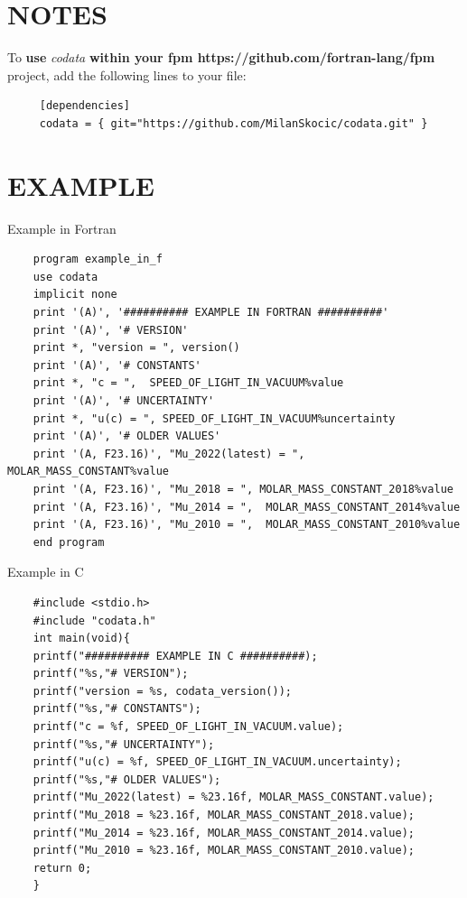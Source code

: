 \section{NOTES}

To \textbf{use }\emph{codata}\textbf{ within your fpm
https://github.com/fortran-lang/fpm} project, add the following lines to
your file:

\begin{verbatim}
     [dependencies]
     codata = { git="https://github.com/MilanSkocic/codata.git" }
\end{verbatim}

\section{EXAMPLE}

Example in Fortran

\begin{verbatim}
    program example_in_f
    use codata
    implicit none
    print '(A)', '########## EXAMPLE IN FORTRAN ##########'
    print '(A)', '# VERSION'
    print *, "version = ", version()
    print '(A)', '# CONSTANTS'
    print *, "c = ",  SPEED_OF_LIGHT_IN_VACUUM%value
    print '(A)', '# UNCERTAINTY'
    print *, "u(c) = ", SPEED_OF_LIGHT_IN_VACUUM%uncertainty
    print '(A)', '# OLDER VALUES'
    print '(A, F23.16)', "Mu_2022(latest) = ", MOLAR_MASS_CONSTANT%value
    print '(A, F23.16)', "Mu_2018 = ", MOLAR_MASS_CONSTANT_2018%value
    print '(A, F23.16)', "Mu_2014 = ",  MOLAR_MASS_CONSTANT_2014%value
    print '(A, F23.16)', "Mu_2010 = ",  MOLAR_MASS_CONSTANT_2010%value
    end program
\end{verbatim}

Example in C

\begin{verbatim}
    #include <stdio.h>
    #include "codata.h"
    int main(void){
    printf("########## EXAMPLE IN C ##########);
    printf("%s,"# VERSION");
    printf("version = %s, codata_version());
    printf("%s,"# CONSTANTS");
    printf("c = %f, SPEED_OF_LIGHT_IN_VACUUM.value);
    printf("%s,"# UNCERTAINTY");
    printf("u(c) = %f, SPEED_OF_LIGHT_IN_VACUUM.uncertainty);
    printf("%s,"# OLDER VALUES");
    printf("Mu_2022(latest) = %23.16f, MOLAR_MASS_CONSTANT.value);
    printf("Mu_2018 = %23.16f, MOLAR_MASS_CONSTANT_2018.value);
    printf("Mu_2014 = %23.16f, MOLAR_MASS_CONSTANT_2014.value);
    printf("Mu_2010 = %23.16f, MOLAR_MASS_CONSTANT_2010.value);
    return 0;
    }
\end{verbatim}

